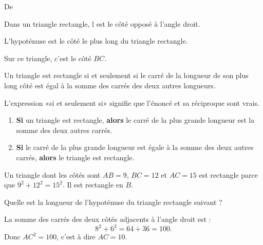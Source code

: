 

De \cite{NRHooXFvgpp4}

\begin{definition}
    Dans un triangle rectangle, l est le côté opposé à l'angle droit.
\end{definition}
\begin{remark}
    L'hypoténuse est le côté le plus long du triangle rectangle.
\end{remark}

\begin{example}
    Sur ce triangle, c'est le côté \( BC\).
    \begin{center}
        
    \end{center}
\end{example}

\begin{theorem}[de Pythagore]
    Un triangle est rectangle si et seulement si le carré de la longueur de son plus long côté est égal à la somme des carrés des deux autres longueurs.
\end{theorem}

\begin{remark}
    L'expression «si et seulement si» signifie que l'énoncé et sa réciproque sont vrais.
    \begin{enumerate}
        \item
            {\bf Si} un triangle est rectangle, {\bf alors} le carré de la plus grande longueur est la somme des deux autres carrés.
        \item
            {\bf Si} le carré de la plus grande longueur est égale à la somme des deux autres carrés, {\bf alors} le triangle est rectangle.
    \end{enumerate}
\end{remark}

\begin{example}
    Un triangle dont les côtés sont \( AB=9\), \( BC=12\) et \( AC=15\) est rectangle parce que \( 9^2+12^2=15^2\). Il est rectangle en \( B\).
\end{example}

\begin{example}
    Quelle est la longueur de l'hypoténuse du triangle rectangle suivant ?
    \begin{center}
        
    \end{center}
    La somme des carrés des deux côtés adjacents à l'angle droit est :
    \begin{equation}
        8^2+6^2=64+36=100.
    \end{equation}
    Donc \( AC^2=100\), c'est à dire \( AC=10\).
\end{example}
